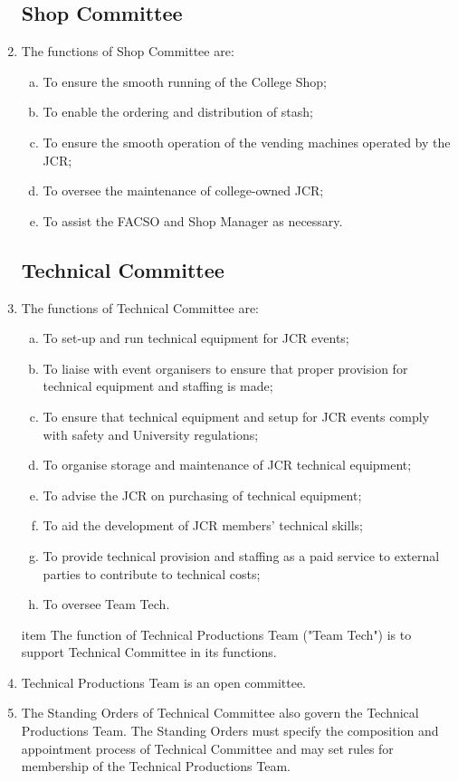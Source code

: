 \documentclass[12pt]{article}  %
\begin{document}
\begin{enumerate}
    \subsection{Shop Committee}
    \item The functions of Shop Committee are:
    \begin{enumerate}[(a)]
        \item To ensure the smooth running of the College Shop;
        \item To enable the ordering and distribution of stash;
        \item To ensure the smooth operation of the vending machines operated by the JCR;
        \item To oversee the maintenance of college-owned JCR;
        \item To assist the FACSO and Shop Manager as necessary.
    \end{enumerate}
    \subsection{Technical Committee}
    \item The functions of Technical Committee are:
    \begin{enumerate}[(a)]
        \item To set-up and run technical equipment for JCR events;
        \item To liaise with event organisers to ensure that proper provision for technical equipment and staffing is made;
        \item To ensure that technical equipment and setup for JCR events comply with safety and University regulations;
        \item To organise storage and maintenance of JCR technical equipment;
        \item To advise the JCR on purchasing of technical equipment;
        \item To aid the development of JCR members' technical skills;
        \item To provide technical provision and staffing as a paid service to external parties to contribute to technical costs;
        \item To oversee Team Tech.
    \end{enumerate}
    item The function of Technical Productions Team ("Team Tech") is to support Technical Committee in its functions.
    \item Technical Productions Team is an open committee.
    \item The Standing Orders of Technical Committee also govern the Technical Productions Team. The Standing Orders must specify the composition and appointment process of Technical Committee and may set rules for membership of the Technical Productions Team.

\end{enumerate}
\end{document}
